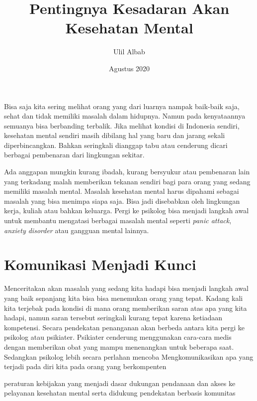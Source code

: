 \documentclass{article}
\title{Pentingnya Kesadaran Akan Kesehatan Mental}
\author{Ulil Albab }
\date{Agustus 2020}
\begin{document}
\maketitle

Bisa saja kita sering melihat orang yang dari luarnya nampak baik-baik saja, sehat dan tidak memiliki masalah dalam hidupnya. Namun pada kenyataannya semuanya bisa berbanding terbalik. Jika melihat kondisi di Indonesia sendiri, kesehatan mental sendiri masih dibilang hal yang baru dan jarang sekali diperbincangkan. Bahkan seringkali dianggap tabu atau cenderung dicari berbagai pembenaran dari lingkungan sekitar.  \par
Ada anggapan mungkin kurang ibadah, kurang bersyukur atau pembenaran lain yang terkadang malah memberikan tekanan sendiri bagi para orang yang sedang memiliki masalah mental. Masalah kesehatan mental harus dipahami sebagai masalah yang bisa menimpa siapa saja. Bisa jadi disebabkan oleh lingkungan kerja, kuliah atau bahkan keluarga. Pergi ke psikolog bisa menjadi langkah awal untuk membantu mengatasi berbagai masalah mental seperti \textit{panic attack}, \textit{anxiety disorder} atau gangguan mental lainnya.  

\section{Komunikasi Menjadi Kunci}
Menceritakan akan masalah yang sedang kita hadapi bisa menjadi langkah awal yang baik sepanjang kita bisa bisa menemukan orang yang tepat. Kadang kali kita terjebak pada kondisi di mana orang memberikan saran atas apa yang kita hadapi, namun saran tersebut seringkali kurang tepat karena ketiadaan kompetensi. Secara pendekatan penanganan akan berbeda antara kita pergi ke psikolog atau psikiater. Psikiater cenderung menggunakan cara-cara medis dengan memberikan obat yang mampu menenangkan untuk beberapa saat. Sedangkan psikolog lebih secara perlahan mencoba  Mengkomunikasikan apa yang terjadi pada diri kita pada orang yang berkompenten \par


peraturan kebijakan yang menjadi dasar dukungan pendanaan dan akses ke pelayanan kesehatan
mental serta didukung pendekatan berbasis komunitas \cite{ayuningtyas2018analisis}



\printbibliography
\end{document}
